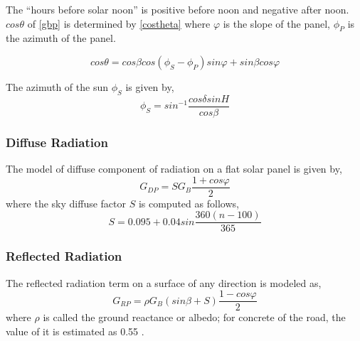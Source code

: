 \documentclass[journal]{IEEEtran/IEEEtran}
\begin{document}
	The “hours before solar noon” is positive before noon and
	negative after noon. $cos\theta$ of \eqref{gbp} is determined by \eqref{costheta} where ${\varphi}$ is the slope of the panel, ${\phi}_P$ is the azimuth of the panel.
	
	\begin{equation}
	\label{costheta}
	cos\theta = cos\beta cos\left({\phi}_S-{\phi}_P\right)sin\varphi+sin\beta cos\varphi
	\end{equation}
	
	The azimuth of the sun ${\phi}_S$ is given by,
	\begin{equation}
	\label{phis}
	{\phi}_S = sin^{-1}\frac{cos\delta sinH}{cos\beta}
	\end{equation}
	\subsubsection{Diffuse Radiation}
	The model of diffuse component of radiation on a flat
	solar panel is given by,
	\begin{equation}
	\label{gdp}
	G_{DP} = SG_B\frac{1+cos\varphi}{2}
	\end{equation}
	where the sky diffuse factor $S$ is computed as follows,
	\begin{equation}
	\label{S}
	S = 0.095+0.04sin\frac{360\left(n-100\right)}{365}
	\end{equation}
	
	\subsubsection{Reflected Radiation}
	The reflected radiation term on a surface of any direction is modeled as,
	\begin{equation}
	\label{grp}
	G_{RP}=\rho G_B\left(sin\beta + S\right)\frac{1-cos\varphi}{2}
	\end{equation}
	where $\rho$ is called the ground reactance or albedo; for concrete of the road, the value of it is estimated as 0.55 \cite{albedo}.
	
\end{document}
